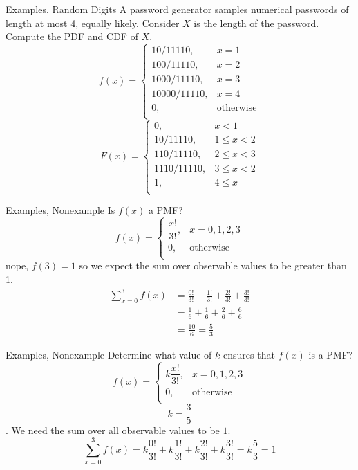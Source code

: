 \documentclass[handout]{beamer}
\newcommand{\nl}[1]{\vspace{#1 em}}
\begin{document}
    \begin{frame}{Examples, Random Digits}
        A password generator samples numerical passwords of length at most 4, equally likely. Consider $X$ is the length of the password. Compute the PDF and CDF of $X$.\\ \nl{0.5}
        $$f(x)= \left\{\begin{array}{lr}
            10/11110, & x = 1\\
            100/11110, &  x = 2\\
            1000/11110, &  x = 3\\
            10000/11110, &  x = 4\\
            0, & \text{otherwise}\\
            \end{array}\right.$$
        \pause $$F(x)= \left\{\begin{array}{lr}
            0, & x<1\\
            10/11110, & 1 \leq x < 2\\
            110/11110, &  2 \leq x < 3\\
            1110/11110, &  3 \leq x < 2\\
            1, &  4 \leq x\\
            \end{array}\right.$$
    \end{frame}
    \begin{frame}{Examples, Nonexample}
        Is $f(x)$ a PMF?
        $$f(x)= \left\{\begin{array}{lr}
            \dfrac{x!}{3!}, & x = 0,1,2,3\\
            0, & \text{otherwise}\\
            \end{array}\right.$$
            \pause nope, $f(3)=1$ so we expect the sum over observable values to be greater than 1.
            \begin{align*}
                \sum_{x=0}^3 f(x) & = \frac{0!}{3!} + \frac{1!}{3!} +\frac{2!}{3!} +\frac{3!}{3!}\\
                 &= \frac{1}{6} + \frac{1}{6} +\frac{2}{6} +\frac{6}{6} \\
                 & = \frac{10}{6} = \frac{5}{3}
            \end{align*}

    \end{frame}
    \begin{frame}{Examples, Nonexample}
        Determine what value of $k$ ensures that $f(x)$ is a PMF?
        $$f(x)= \left\{\begin{array}{lr}
            k \dfrac{x!}{3!}, & x = 0,1,2,3\\
            0, & \text{otherwise}\\
            \end{array}\right.$$
            \pause $$k = \frac{3}{5}$$. We need the sum over all observable values to be $1$.
            $$ \sum_{x=0}^3 f(x)  = k \frac{0!}{3!} + k \frac{1!}{3!} + k\frac{2!}{3!} +k \frac{3!}{3!} = k \frac{5}{3} = 1$$
            
    \end{frame}
\end{document}
